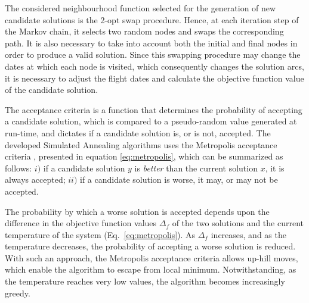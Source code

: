 The considered neighbourhood function selected for the generation of new candidate solutions is the 2-opt swap procedure. Hence, at each iteration step of the Markov chain, it selects two random nodes and swaps the corresponding path. It is also necessary to take into account both the initial and final nodes in order to produce a valid solution. Since this swapping procedure may change the dates at which each node is visited, which consequently changes the solution arcs, it is necessary to adjust the flight dates and calculate the objective function value of the candidate solution.


The acceptance criteria is a function that determines the probability of accepting a candidate solution, which is compared to a pseudo-random value generated at run-time, and dictates if a candidate solution is, or is not, accepted. The developed Simulated Annealing algorithms uses the Metropolis acceptance criteria \cite{metropolis}, presented in equation \ref{eq:metropolis},  which can be summarized as follows: $i)$ if a candidate solution $y$ is \textit{better} than the current solution $x$, it is always accepted; $ii)$ if a candidate solution is worse, it may, or may not be accepted. 

The probability by which a worse solution is accepted depends upon the difference in the objective function values $\Delta_f$ of the two solutions and the current temperature of the system (Eq.~\ref{eq:metropolis}). As $\Delta_f$ increases, and as the temperature decreases, the probability of accepting a worse solution is reduced. With such an approach, the Metropolis acceptance criteria allows up-hill moves, which enable the algorithm to escape from local minimum. Notwithstanding, as the temperature reaches very low values, the algorithm becomes increasingly greedy.

